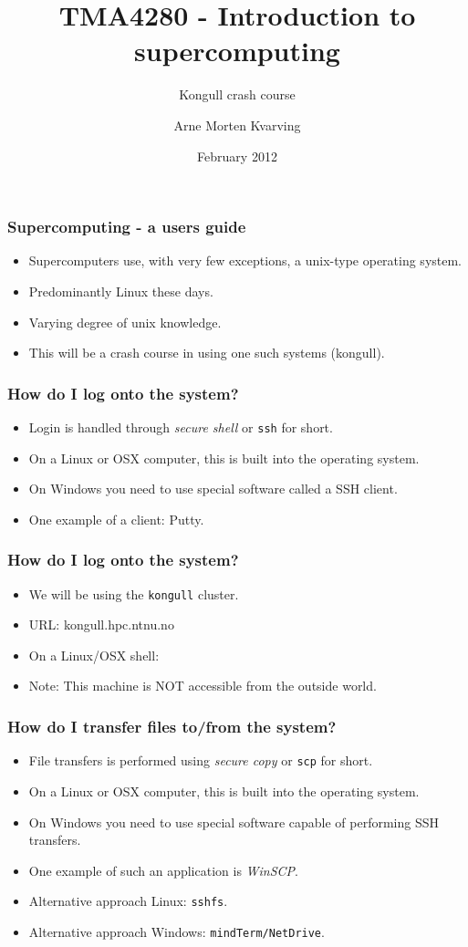 \documentclass{beamer}
\title{TMA4280 - Introduction to supercomputing}
\subtitle{Kongull crash course}
\author{Arne Morten Kvarving}
\institute{NTNU and SINTEF ICT}
\date{February 2012}
\begin{document}
\maketitle
\begin{frame}\frametitle{Supercomputing - a users guide}
\begin{itemize}
    \item Supercomputers use, with very few exceptions, a unix-type operating system.
    \item Predominantly Linux these days.
    \item Varying degree of unix knowledge.
    \item This will be a crash course in using one such systems (kongull).
\end{itemize}
\end{frame}
\begin{frame}\frametitle{How do I log onto the system?}
\begin{itemize}
    \item Login is handled through \emph{secure shell} or \texttt{ssh} for short.
    \item On a Linux or OSX computer, this is built into the operating system.
    \item On Windows you need to use special software called a SSH client.
    \item One example of a client: Putty.
\end{itemize}
\end{frame}
\begin{frame}\frametitle{How do I log onto the system?}
\begin{itemize}
    \item We will be using the \texttt{kongull} cluster.
    \item URL: kongull.hpc.ntnu.no
    \item On a Linux/OSX shell: \small  \normalsize
    \item Note: This machine is NOT accessible from the outside world.
\end{itemize}
\end{frame}
\begin{frame}\frametitle{How do I transfer files to/from the system?}
\begin{itemize}
    \item File transfers is performed using \emph{secure copy} or \texttt{scp} for short.
    \item On a Linux or OSX computer, this is built into the operating system.
    \item On Windows you need to use special software capable of performing SSH transfers.
    \item One example of such an application is \emph{WinSCP}.
    \item Alternative approach Linux: \texttt{sshfs}.
    \item Alternative approach Windows: \texttt{mindTerm/NetDrive}.
\end{itemize}
\end{frame}
\end{document}
